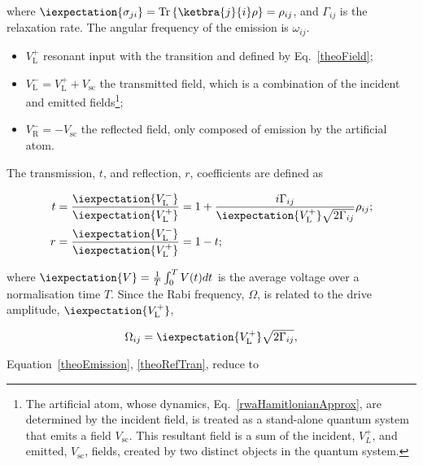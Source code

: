 \noindent                                                                   where
$        \iexpectation{\sigma_{ji}}=\text{Tr}\left\lbrace       \ketbra{j}{i}\rho
\right\rbrace  = \rho_{ij}  $, and  $ \Gamma_{ij}  $ is  the \lra{}
relaxation rate. The angular frequency of the emission is $ \omega_{ij} $.
\begin{itemize}
\item  $   V_{\text{L}}^{+}  $  resonant  input   with  the  \lra{}
  transition and defined by Eq.~\eqref{theoField};
\item $ V_{\text{L}}^{-} = V_{\text{L}}^{+}+V_{\text{sc}}$ the transmitted field,
  which  is  a  combination  of  the  incident  and  emitted  fields\footnote{The
    artificial  atom,   whose  dynamics,   Eq.~\eqref{rwaHamitlonianApprox},  are
    determined by the incident field, is  treated as a stand-alone quantum system
    that emits a  field $ V_{\text{sc}} $.  This resultant field is a  sum of the
    incident, $V_{L}^{+}  $, and emitted,  $ V_{\text{sc}} $, fields,  created by
    two distinct objects in the quantum system.};
\item $ V_{\text{R}}^{-} = - V_{\text{sc}}$ the reflected field, only composed of
  emission by the artificial atom.
\end{itemize}

The transmission, $ t $, and reflection, $ r $, coefficients are defined as

\begin{equation}\label{theoRefTran}
  \begin{aligned}
    t & = \frac{\iexpectation{V_{\text{L}}^{-}}}{\iexpectation{V_{\text{L}}^{+}}} = 1+\frac{i\Gamma_{ij}}{\iexpectation{V_{\text{L}}^{+}}\sqrt{2\Gamma_{ij}}}\rho_{ij};\\
    r & = \frac{\iexpectation{V_{\text{L}}^{-}}}{\iexpectation{V_{\text{L}}^{+}}}
    = 1-t;
  \end{aligned}
\end{equation}

\noindent where $\iexpectation{V} = \frac{1}{T}\int_{0}^{T}V(t)dt$ is the average
voltage over a normalisation time $ T $. Since the Rabi frequency, $ \Omega $, is
related to the drive amplitude, $ \iexpectation{V_{\text{L}}^{+}} $,

\begin{equation}
  \Omega_{ij}=\iexpectation{V_{\text{L}}^{+}}\sqrt{2\Gamma_{ij}},
\end{equation}

\noindent Equation~\eqref{theoEmission}, \eqref{theoRefTran}, reduce to

